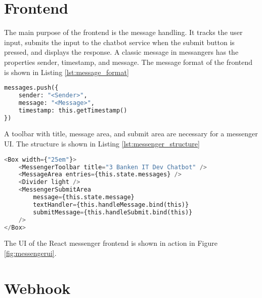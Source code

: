 



\section{Frontend}
The main purpose of the frontend is the message handling.
It tracks the user input, submits the input to the chatbot service 
when the submit button is pressed, 
and displays the response.
A classic message in messangers has the properties sender, timestamp, and message.
The message format of the frontend is shown in Listing \ref{lst:message_format}
\begin{lstlisting}[caption={Message Format}, label={lst:message_format},captionpos=b,frame=single,language={Python},commentstyle=\color{mygreen},keywordstyle=\color{blue},
    morekeywords={}]                
messages.push({
    sender: "<Sender>",
    message: "<Message>",
    timestamp: this.getTimestamp()
})
\end{lstlisting}  
A toolbar with title, message area, and submit area are necessary for a messenger UI.
The structure is shown in Listing \ref{lst:messenger_structure}
\begin{lstlisting}[caption={Messenger Structure}, label={lst:messenger_structure},captionpos=b,frame=single,language={Python},commentstyle=\color{mygreen},keywordstyle=\color{blue},
    morekeywords={MessengerToolbar, MessageArea, Divider, MessengerSubmitArea, Box}]                
<Box width={"25em"}>
    <MessengerToolbar title="3 Banken IT Dev Chatbot" />
    <MessageArea entries={this.state.messages} />
    <Divider light />
    <MessengerSubmitArea 
        message={this.state.message} 
        textHandler={this.handleMessage.bind(this)} 
        submitMessage={this.handleSubmit.bind(this)} 
    />
</Box>
\end{lstlisting}  


The UI of the React messenger frontend is shown in action in Figure \ref{fig:messengerui}.
\section{Webhook}
